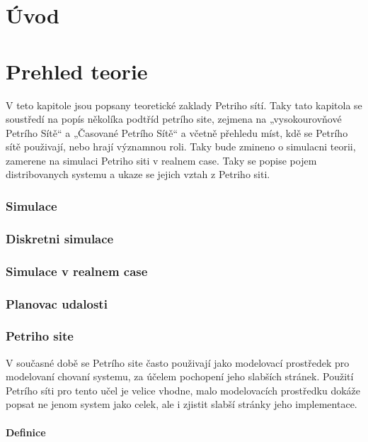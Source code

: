 \chapter{Úvod}
\chapter{Prehled teorie}
\label{prehled}

V teto kapitole jsou popsany teoretické zaklady Petriho sítí. Taky tato kapitola se soustředí na popís několíka podtříd petrího site, zejmena na „vysokourovňové Petrího Sítě“ a „Časované Petrího Sítě“ a  včetně přehledu míst, kdě se Petrího sítě použivají, nebo hrají významnou roli. Taky bude zmineno o simulacni teorii, zamerene na simulaci Petriho siti v realnem case. Taky se popise pojem distribovanych systemu a ukaze se jejich vztah z Petriho siti.

\subsection*{Simulace}
\subsection*{Diskretni simulace}
\subsection*{Simulace v realnem case}
\subsection*{Planovac udalosti}
\subsection*{Petriho site}
V současné době se Petrího site často použivají jako modelovací prostředek pro modelovaní chovaní systemu, za účelem pochopení jeho slabších stránek. Použití Petrího síti pro tento učel je velice vhodne, malo modelovacích prostředku dokáže popsat ne jenom system jako celek, ale i zjistit slabší stránky jeho implementace.
\subsubsection*{Definice}

